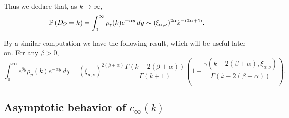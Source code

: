 Thus we deduce that, as $k \to \infty$,
\begin{equation}\label{eq:degree_distribution_P_asymptotics}
	\mathbb{P}\left(D_{{\mathcal P}} = k\right) = \int_0^\infty \rho_{y}(k) e^{-\alpha y} \, dy \sim (\xi_{\alpha,\nu})^{2\alpha} k^{-(2\alpha + 1)}.
\end{equation}

By a similar computation we have the following result, which will be useful later on. For any $\beta > 0$,
\begin{equation}\label{eq:general_integral_rho_y_k}
	\int_0^\infty e^{\beta y} \rho_y(k) e^{-\alpha y} \, dy
    = \left(\xi_{\alpha,\nu}\right)^{2(\beta + \alpha)} \frac{\Gamma(k - 2(\beta + \alpha))}{\Gamma(k+1)}
    	\left(1 - \frac{\gamma(k - 2(\beta + \alpha), \xi_{\alpha,\nu})}{\Gamma(k - 2(\beta + \alpha))}\right).
\end{equation}

\subsection{Asymptotic behavior of $c_\infty(k)$}\label{ssec:asymptotics_local_clustering_P}

%

